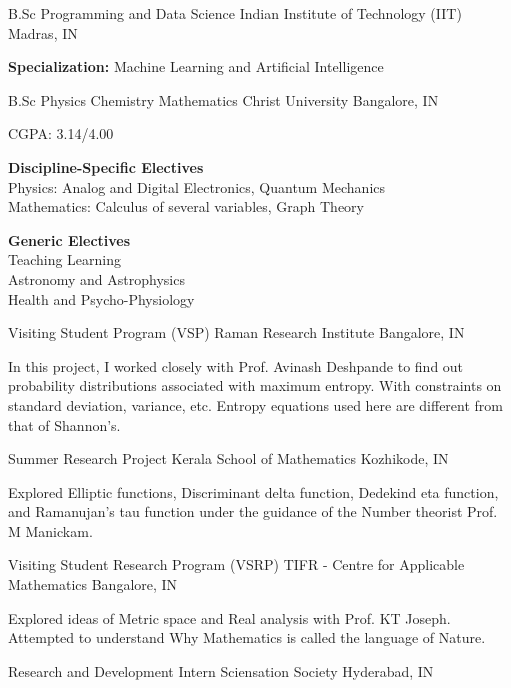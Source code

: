 





{B.Sc Programming and Data Science}
{Indian Institute of Technology (IIT)}
{Madras, IN}

\textbf{Specialization:}
Machine Learning and Artificial Intelligence

{B.Sc Physics Chemistry Mathematics}
{Christ University}
{Bangalore, IN}

CGPA: 3.14/4.00
\medskip

\textbf{Discipline-Specific Electives}\\
Physics: Analog and Digital Electronics, Quantum Mechanics\\
Mathematics: Calculus of several variables, Graph Theory
\medskip

\textbf{Generic Electives}\\
Teaching Learning\\
Astronomy and Astrophysics\\
Health and Psycho-Physiology


{Visiting Student Program (VSP)}
{Raman Research Institute}
{Bangalore, IN}

In this project, I worked closely with Prof. Avinash Deshpande to find out probability distributions associated with maximum entropy. With constraints on standard deviation, variance, etc. Entropy equations used here are different from that of Shannon's.

{Summer Research Project}
{Kerala School of Mathematics}
{Kozhikode, IN}

Explored Elliptic functions, Discriminant delta function, Dedekind eta function, and Ramanujan’s tau function under the guidance of the Number theorist Prof. M Manickam.

{Visiting Student Research Program (VSRP)}
{TIFR - Centre for Applicable Mathematics}
{Bangalore, IN}

Explored ideas of Metric space and Real analysis with Prof. KT Joseph. Attempted to understand Why Mathematics is called the language of Nature.
\newpage
{}

{Research and Development Intern}
{Sciensation Society}
{Hyderabad, IN}


